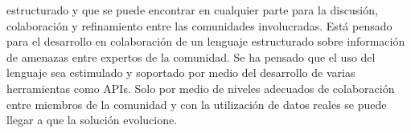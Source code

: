 \begin{itemize}
estructurado y que se puede encontrar en cualquier parte para la discusión, 
colaboración y refinamiento entre las comunidades involucradas. Está pensado 
para el desarrollo en colaboración de un lenguaje estructurado sobre información de 
amenazas entre expertos de la comunidad. Se ha pensado que el uso del lenguaje 
sea estimulado y soportado por medio del desarrollo de varias herramientas como 
APIs. Solo por medio de niveles adecuados de colaboración entre miembros de la 
comunidad y con la utilización de datos reales se puede llegar a que la solución 
evolucione.
\end{itemize}








